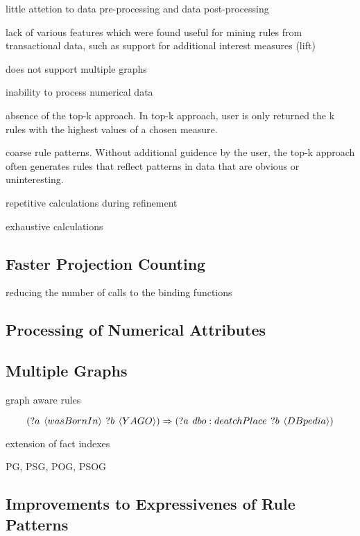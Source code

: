 little attetion to data pre-processing and data post-processing

lack of various features which were found useful for mining rules from transactional data, such as support for additional interest measures (lift)

does not support multiple graphs

inability to process numerical data

absence of the top-k approach. In top-k approach, user is only returned the k rules with the highest values of a chosen measure.

coarse rule patterns. Without additional guidence by the user, the top-k approach often generates rules that reflect patterns in data that are obvious or uninteresting.

repetitive calculations during refinement

exhaustive calculations

\subsection{Faster Projection Counting}

reducing the number of calls to the binding functions


\subsection{Processing of Numerical Attributes}

\subsection{Multiple Graphs}

graph aware rules

$$(?a \hspace{0.4em} \langle wasBornIn \rangle \hspace{0.4em} ?b \hspace{0.4em} \langle YAGO \rangle) \Rightarrow (?a \hspace{0.4em} dbo:deatchPlace \hspace{0.4em} ?b \hspace{0.4em} \langle DBpedia \rangle)$$

extension of fact indexes

PG, PSG, POG, PSOG

\subsection{Improvements to Expressivenes of Rule Patterns}

